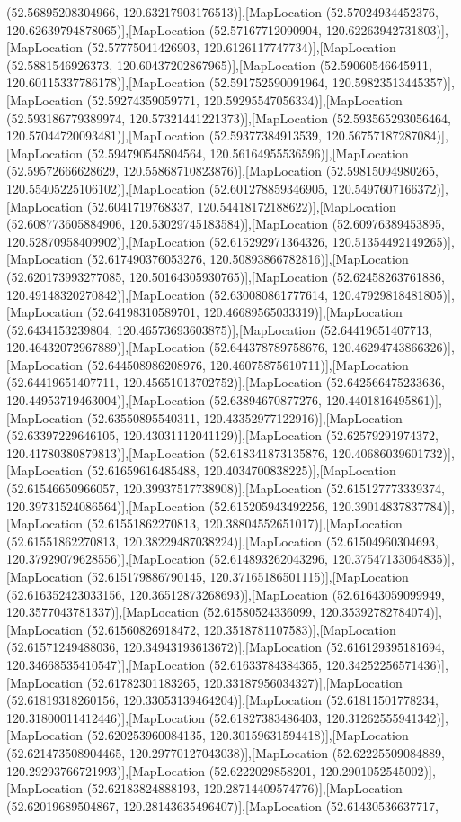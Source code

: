(52.56895208304966, 120.63217903176513)],[MapLocation (52.57024934452376, 120.62639794878065)],[MapLocation (52.57167712090904, 120.62263942731803)],[MapLocation (52.57775041426903, 120.6126117747734)],[MapLocation (52.5881546926373, 120.60437202867965)],[MapLocation (52.59060546645911, 120.60115337786178)],[MapLocation (52.591752590091964, 120.59823513445357)],[MapLocation (52.59274359059771, 120.59295547056334)],[MapLocation (52.593186779389974, 120.57321441221373)],[MapLocation (52.593565293056464, 120.57044720093481)],[MapLocation (52.59377384913539, 120.56757187287084)],[MapLocation (52.594790545804564, 120.56164955536596)],[MapLocation (52.59572666628629, 120.55868710823876)],[MapLocation (52.59815094980265, 120.55405225106102)],[MapLocation (52.601278859346905, 120.5497607166372)],[MapLocation (52.6041719768337, 120.54418172188622)],[MapLocation (52.608773605884906, 120.53029745183584)],[MapLocation (52.60976389453895, 120.52870958409902)],[MapLocation (52.615292971364326, 120.51354492149265)],[MapLocation (52.617490376053276, 120.50893866782816)],[MapLocation (52.620173993277085, 120.50164305930765)],[MapLocation (52.62458263761886, 120.49148320270842)],[MapLocation (52.630080861777614, 120.47929818481805)],[MapLocation (52.64198310589701, 120.46689565033319)],[MapLocation (52.6434153239804, 120.46573693603875)],[MapLocation (52.64419651407713, 120.46432072967889)],[MapLocation (52.644378789758676, 120.46294743866326)],[MapLocation (52.644508986208976, 120.46075875610711)],[MapLocation (52.64419651407711, 120.45651013702752)],[MapLocation (52.642566475233636, 120.44953719463004)],[MapLocation (52.63894670877276, 120.4401816495861)],[MapLocation (52.63550895540311, 120.43352977122916)],[MapLocation (52.63397229646105, 120.43031112041129)],[MapLocation (52.62579291974372, 120.41780380879813)],[MapLocation (52.618341873135876, 120.40686039601732)],[MapLocation (52.61659616485488, 120.4034700838225)],[MapLocation (52.61546650966057, 120.39937517738908)],[MapLocation (52.615127773339374, 120.39731524086564)],[MapLocation (52.615205943492256, 120.39014837837784)],[MapLocation (52.61551862270813, 120.38804552651017)],[MapLocation (52.61551862270813, 120.38229487038224)],[MapLocation (52.61504960304693, 120.37929079628556)],[MapLocation (52.614893262043296, 120.37547133064835)],[MapLocation (52.615179886790145, 120.37165186501115)],[MapLocation (52.616352423033156, 120.36512873268693)],[MapLocation (52.61643059099949, 120.3577043781337)],[MapLocation (52.61580524336099, 120.35392782784074)],[MapLocation (52.61560826918472, 120.3518781107583)],[MapLocation (52.61571249488036, 120.34943193613672)],[MapLocation (52.616129395181694, 120.34668535410547)],[MapLocation (52.61633784384365, 120.34252256571436)],[MapLocation (52.61782301183265, 120.33187956034327)],[MapLocation (52.61819318260156, 120.33053139464204)],[MapLocation (52.61811501778234, 120.31800011412446)],[MapLocation (52.61827383486403, 120.31262555941342)],[MapLocation (52.620253960084135, 120.30159631594418)],[MapLocation (52.621473508904465, 120.29770127043038)],[MapLocation (52.62225509084889, 120.29293766721993)],[MapLocation (52.6222029858201, 120.2901052545002)],[MapLocation (52.62183824888193, 120.28714409574776)],[MapLocation (52.62019689504867, 120.28143635496407)],[MapLocation (52.61430536637717, 
